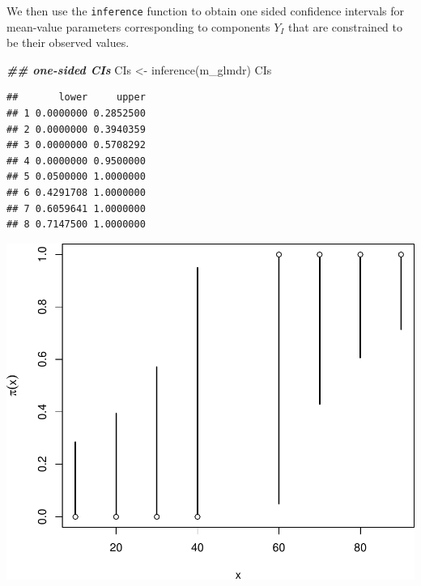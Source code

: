 \documentclass[
  ignorenonframetext,
]{beamer}
\newenvironment{Shaded}{\begin{snugshade}}{\end{snugshade}}
\newcommand{\DocumentationTok}[1]{\textcolor[rgb]{0.56,0.35,0.01}{\textbf{\textit{#1}}}}
\newcommand{\FunctionTok}[1]{\textcolor[rgb]{0.00,0.00,0.00}{#1}}
\newcommand{\NormalTok}[1]{#1}
\newcommand{\OtherTok}[1]{\textcolor[rgb]{0.56,0.35,0.01}{#1}}
\begin{document}
\begin{frame}[fragile]{}
\protect\hypertarget{section-14}{}
We then use the \texttt{inference} function to obtain one sided
confidence intervals for mean-value parameters corresponding to
components \(Y_I\) that are constrained to be their observed values.

\vspace{12pt}
\tiny

\begin{Shaded}
\begin{Highlighting}[]
\DocumentationTok{\#\# one{-}sided CIs}
\NormalTok{CIs }\OtherTok{\textless{}{-}} \FunctionTok{inference}\NormalTok{(m\_glmdr)}
\NormalTok{CIs}
\end{Highlighting}
\end{Shaded}

\begin{verbatim}
##       lower     upper
## 1 0.0000000 0.2852500
## 2 0.0000000 0.3940359
## 3 0.0000000 0.5708292
## 4 0.0000000 0.9500000
## 5 0.0500000 1.0000000
## 6 0.4291708 1.0000000
## 7 0.6059641 1.0000000
## 8 0.7147500 1.0000000
\end{verbatim}
\end{frame}

\begin{frame}{}
\protect\hypertarget{section-15}{}
\begin{center}\includegraphics{week7_p2_files/figure-beamer/unnamed-chunk-14-1} \end{center}
\end{frame}
\end{document}
